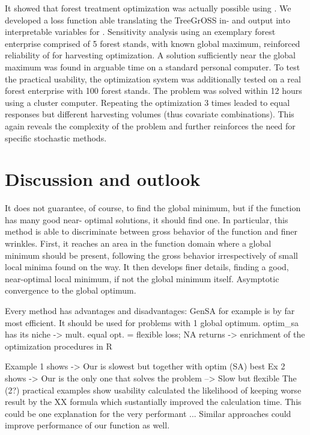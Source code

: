 It showed that forest treatment optimization was actually possible using . We developed a loss function able translating the TreeGrOSS in- and output into interpretable variables for . Sensitivity analysis using an exemplary forest enterprise comprised of 5 forest stands, with known global maximum, reinforced reliability of  for harvesting optimization. A solution sufficiently near the global maximum was found in arguable time on a standard personal computer. To test the practical usability, the optimization system was additionally tested on a real forest enterprise with 100 forest stands. The problem was solved within 12 hours using a cluster computer. Repeating the optimization 3 times leaded to equal responses but different harvesting volumes (thus covariate combinations). This again reveals the complexity of the problem and further reinforces the need for specific stochastic methods.

\section{Discussion and outlook}
It does not guarantee, of course, to find the global minimum, but if the function has many good near- optimal solutions, it should find one. In particular, this method is able to discriminate between gross behavior of the function and finer wrinkles. First, it reaches an area in the function domain where a global minimum should be present, following the gross behavior irrespectively of small local minima found on the way. It then develops finer details, finding a good, near-optimal local minimum, if not the global minimum itself.
Asymptotic convergence to the global optimum.

Every method has advantages and disadvantages: GenSA for example is by far most efficient. It should be used for problems with 1 global optimum. optim\_sa has its niche -> mult. equal opt. = flexible loss; NA returns
-> enrichment of the optimization procedures in R  

Example 1 shows -> Our is slowest but together with optim (SA) best
Ex 2 shows -> Our is the only one that solves the problem
--> Slow but flexible
The (2?) practical examples show usability
\citet{xiang_2013} calculated the likelihood of keeping worse result by the XX formula which sustantially improved the calculation time. This could be one explanation for the very performant ... Similar approaches could improve performance of our function as well.



\address{Author One\\
    Affiliation\\
    Address\\
    Country\\}

\address{Author Two\\
    Affiliation\\
    Address\\
    Country\\}

\address{Author Three\\
    Affiliation\\
    Address\\
    Country\\}
